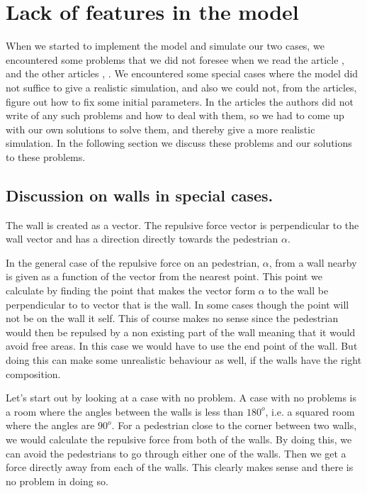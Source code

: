 \section{Lack of features in the model}

\label{sec:lack}
When we started to implement the model and simulate our two cases, we encountered some
problems that we did not foresee when we read the article \cite{self-org}, and the other
articles \cite{helbing00}, \cite{social-force}.
We encountered some special cases where the model did not suffice to give a realistic
simulation, and also we could not, from the articles, figure out how to fix some initial parameters.
In the articles the authors did not write of any such problems and how to deal with them,
so we had to come up with our own solutions to solve them, and thereby give a more realistic
simulation.
In the following section we discuss these problems and our solutions to these problems.

\subsection{Discussion on walls in special cases.}\label{wallEndpoints}
The wall is created as a vector. The repulsive force vector is perpendicular to the wall 
vector and has a direction directly towards the pedestrian $\alpha$.

In the general case of the repulsive force on an pedestrian, $\alpha$, from a wall 
nearby is given as a function of the vector from the nearest point. This point we 
calculate by finding the point that makes the vector form $\alpha$ to the wall be 
perpendicular to to vector that is the wall. In some cases though the point will not 
be on the wall it self. This of course makes no sense since the pedestrian would then be 
repulsed by a non existing part of the wall meaning that it would avoid free 
areas. In this case we would have to use the end point of the wall. But doing this 
can make some unrealistic behaviour as well, if the walls have the right composition. 

Let's start out by looking at a case with no problem. A case with no problems is a 
room where the angles between the walls is less than $180^o$, i.e. a squared room 
where the angles are $90^o$. For a pedestrian close to the corner between two walls, we 
would calculate the repulsive force from both of the walls. By doing this, we can avoid 
the pedestrians to go through either one of the walls. Then we get a force directly away 
from each of the walls. This clearly makes sense and there is no problem in doing so.

